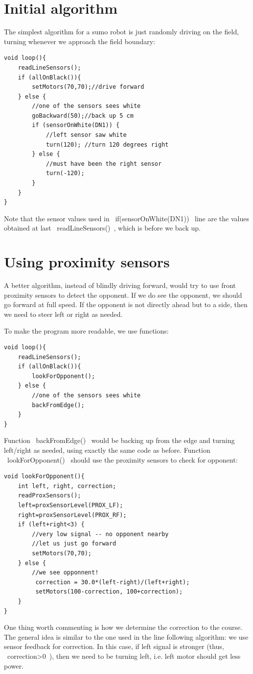 \documentclass[oneside]{stml-l}
\numberwithin{figure}{chapter}
\begin{document}
\section{Initial algorithm}
The simplest algorithm for a sumo robot is just randomly driving on the
field, turning whenever we approach the field boundary:


\begin{lstlisting}
void loop(){
    readLineSensors();
    if (allOnBlack()){
        setMotors(70,70);//drive forward
    } else {
        //one of the sensors sees white
        goBackward(50);//back up 5 cm
        if (sensorOnWhite(DN1)) {
            //left sensor saw white
            turn(120); //turn 120 degrees right
        } else {
            //must have been the right sensor
            turn(-120);
        }
    }
}
\end{lstlisting}

Note that the sensor values used in ~if(sensorOnWhite(DN1))~ line are the values
obtained at  last ~readLineSensors()~, which is before we back up.


\section{Using proximity sensors}
A better algorithm, instead of blindly driving forward, would try to use
front proximity sensors to detect the opponent. If we do see the opponent,
we should go forward at full speed. If the opponent is not directly ahead
but to a side, then we need to steer left or right as needed.

To make the program more readable, we use functions:

\begin{lstlisting}
void loop(){
    readLineSensors();
    if (allOnBlack()){
        lookForOpponent();
    } else {
        //one of the sensors sees white
        backFromEdge();
    }
}
\end{lstlisting}

Function ~backFromEdge()~ would be backing up from the edge and turning
left/right as needed, using exactly the same code as before. Function
 ~lookForOpponent()~ should use the proximity sensors to check for opponent:
\begin{lstlisting}
void lookForOpponent(){
    int left, right, correction;
    readProxSensors();
    left=proxSensorLevel(PROX_LF);
    right=proxSensorLevel(PROX_RF);
    if (left+right<3) {
        //very low signal -- no opponent nearby
        //let us just go forward
        setMotors(70,70);
    } else {
        //we see opponnent!
         correction = 30.0*(left-right)/(left+right);
         setMotors(100-correction, 100+correction);
    }
}
\end{lstlisting}
One thing  worth commenting is how we determine the
correction to the course. The general idea is similar to the one used
in the line following algorithm: we use sensor feedback for correction.
In this case, if left signal is stronger (thus, ~correction>0~), then
we need to be turning left, i.e. left motor should get less power.
\end{document}
